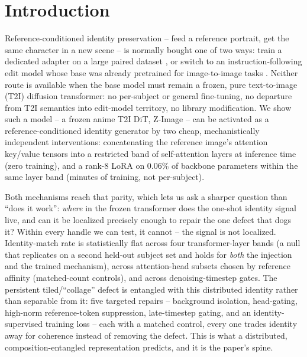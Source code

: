 \section{Introduction}\label{sec:intro}

Reference-conditioned identity preservation -- feed a reference portrait,
get the same character in a new scene -- is normally bought one of two
ways: train a dedicated adapter on a large paired dataset
\citep{ye2023ipadapter,li2023photomaker,wang2024instantid}, or switch to
an instruction-following edit model whose base was already pretrained
for image-to-image tasks \citep{blackforest2025fluxkontext}. Neither
route is available when the base model must remain a frozen, pure
text-to-image (T2I) diffusion transformer: no per-subject or general
fine-tuning, no departure from T2I semantics into edit-model territory,
no library modification. We show such a model -- a frozen anime T2I DiT,
Z-Image \citep{zimage2025} -- can be activated as a reference-conditioned
identity generator by two cheap, mechanistically independent
interventions: concatenating the reference image's attention key/value
tensors into a restricted band of self-attention layers at inference
time (zero training), and a rank-8 LoRA on 0.06\% of backbone parameters
within the same layer band (minutes of training, not per-subject).

Both mechanisms reach that parity, which lets us ask a sharper question
than ``does it work'': \emph{where} in the frozen transformer does the
one-shot identity signal live, and can it be localized precisely enough
to repair the one defect that dogs it? Within every handle we can test,
it cannot -- the signal is not localized. Identity-match rate is
statistically flat across four transformer-layer bands (a null that
replicates on a second held-out subject set and holds for \emph{both} the
injection and the trained mechanism), across attention-head subsets
chosen by reference affinity (matched-count controls), and across
denoising-timestep gates. The persistent tiled/``collage'' defect is
entangled with this distributed identity rather than separable from it:
five targeted repairs -- background isolation, head-gating, high-norm
reference-token suppression, late-timestep gating, and an
identity-supervised training loss -- each with a matched control, every
one trades identity away for coherence instead of removing the defect.
This is what a distributed, composition-entangled representation
predicts, and it is the paper's spine.

